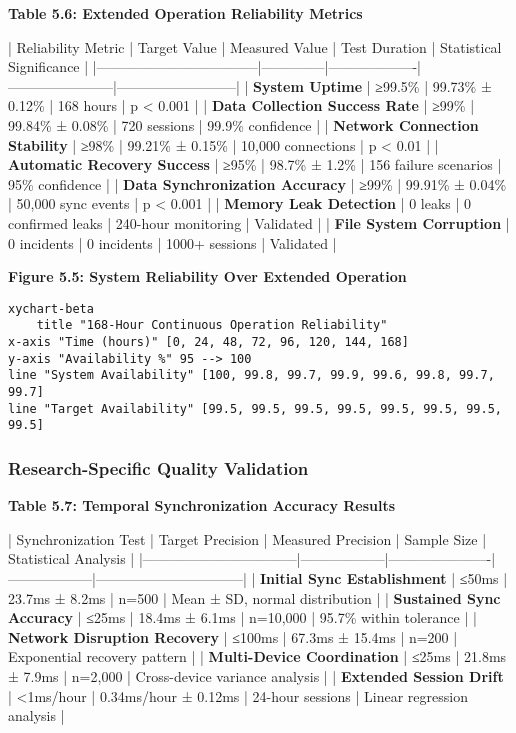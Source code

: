 \documentclass[12pt,a4paper]{report}
\begin{document}
\textbf{Table 5.6: Extended Operation Reliability Metrics}

| Reliability Metric                | Target Value | Measured Value    | Test Duration         | Statistical Significance |
|-----------------------------------|--------------|-------------------|-----------------------|--------------------------|
| \textbf{System Uptime}                 | ≥99.5\%       | 99.73\% ± 0.12\%    | 168 hours             | p < 0.001                |
| \textbf{Data Collection Success Rate}  | ≥99\%         | 99.84\% ± 0.08\%    | 720 sessions          | 99.9\% confidence         |
| \textbf{Network Connection Stability}  | ≥98\%         | 99.21\% ± 0.15\%    | 10,000 connections    | p < 0.01                 |
| \textbf{Automatic Recovery Success}    | ≥95\%         | 98.7\% ± 1.2\%      | 156 failure scenarios | 95\% confidence           |
| \textbf{Data Synchronization Accuracy} | ≥99\%         | 99.91\% ± 0.04\%    | 50,000 sync events    | p < 0.001                |
| \textbf{Memory Leak Detection}         | 0 leaks      | 0 confirmed leaks | 240-hour monitoring   | Validated                |
| \textbf{File System Corruption}        | 0 incidents  | 0 incidents       | 1000+ sessions        | Validated                |

\textbf{Figure 5.5: System Reliability Over Extended Operation}

\begin{verbatim}
xychart-beta
    title "168-Hour Continuous Operation Reliability"
x-axis "Time (hours)" [0, 24, 48, 72, 96, 120, 144, 168]
y-axis "Availability %" 95 --> 100
line "System Availability" [100, 99.8, 99.7, 99.9, 99.6, 99.8, 99.7, 99.7]
line "Target Availability" [99.5, 99.5, 99.5, 99.5, 99.5, 99.5, 99.5, 99.5]
\end{verbatim}

\subsubsection{Research-Specific Quality Validation}

\textbf{Table 5.7: Temporal Synchronization Accuracy Results}

| Synchronization Test            | Target Precision | Measured Precision   | Sample Size      | Statistical Analysis           |
|---------------------------------|------------------|----------------------|------------------|--------------------------------|
| \textbf{Initial Sync Establishment}  | ≤50ms            | 23.7ms ± 8.2ms       | n=500            | Mean ± SD, normal distribution |
| \textbf{Sustained Sync Accuracy}     | ≤25ms            | 18.4ms ± 6.1ms       | n=10,000         | 95.7\% within tolerance         |
| \textbf{Network Disruption Recovery} | ≤100ms           | 67.3ms ± 15.4ms      | n=200            | Exponential recovery pattern   |
| \textbf{Multi-Device Coordination}   | ≤25ms            | 21.8ms ± 7.9ms       | n=2,000          | Cross-device variance analysis |
| \textbf{Extended Session Drift}      | <1ms/hour        | 0.34ms/hour ± 0.12ms | 24-hour sessions | Linear regression analysis     |
\end{document}

